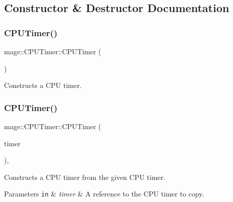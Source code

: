 \subsection{Constructor \& Destructor Documentation}
\hypertarget{classmage_1_1_c_p_u_timer_a52f2c0bdd6377df54363ff775a6ec430}{}\label{classmage_1_1_c_p_u_timer_a52f2c0bdd6377df54363ff775a6ec430} 
\subsubsection{\texorpdfstring{C\+P\+U\+Timer()}{CPUTimer()}\hspace{0.1cm}{\footnotesize\ttfamily [1/3]}}
{\footnotesize\ttfamily mage\+::\+C\+P\+U\+Timer\+::\+C\+P\+U\+Timer (\begin{DoxyParamCaption}{ }\end{DoxyParamCaption})\hspace{0.3cm}{\ttfamily [noexcept]}}

Constructs a C\+PU timer. \hypertarget{classmage_1_1_c_p_u_timer_a23afe7d7b5d85ecf1275f750a935e7c3}{}\label{classmage_1_1_c_p_u_timer_a23afe7d7b5d85ecf1275f750a935e7c3} 
\subsubsection{\texorpdfstring{C\+P\+U\+Timer()}{CPUTimer()}\hspace{0.1cm}{\footnotesize\ttfamily [2/3]}}
{\footnotesize\ttfamily mage\+::\+C\+P\+U\+Timer\+::\+C\+P\+U\+Timer (\begin{DoxyParamCaption}\item[{const \hyperlink{classmage_1_1_c_p_u_timer}{C\+P\+U\+Timer} \&}]{timer }\end{DoxyParamCaption})\hspace{0.3cm}{\ttfamily [default]}, {\ttfamily [noexcept]}}

Constructs a C\+PU timer from the given C\+PU timer.


\begin{DoxyParams}[1]{Parameters}
\mbox{\tt in}  & {\em timer} & A reference to the C\+PU timer to copy. \\
\hline
\end{DoxyParams}
\hypertarget{classmage_1_1_c_p_u_timer_a7915bc9952e7607ffbe93f18dd1cb0b4}{}\label{classmage_1_1_c_p_u_timer_a7915bc9952e7607ffbe93f18dd1cb0b4} 

